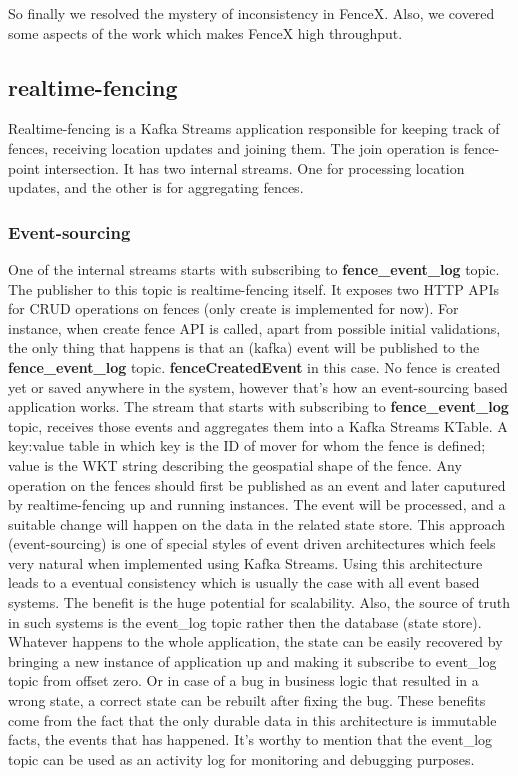 \documentclass[a4]{report}
\begin{document}
    So finally we resolved the mystery of inconsistency in FenceX. Also, we covered some aspects of the work which
    makes FenceX high throughput.

    \subsection{realtime-fencing}
    Realtime-fencing is a Kafka Streams application responsible for keeping track of fences, receiving location updates
    and joining them.
    The join operation is fence-point intersection.
    It has two internal streams.
    One for processing location updates, and the other is for aggregating fences.

    \subsubsection{Event-sourcing}
    One of the internal streams starts with subscribing to \textbf{fence\_event\_log} topic.
    The publisher to this topic is realtime-fencing itself.
    It exposes two HTTP APIs for CRUD operations on fences (only create is implemented for now).
    For instance, when create fence API is called, apart from possible initial validations, the
    only thing that happens is that an (kafka) event will be published to the \textbf{fence\_event\_log} topic.
    \textbf{fenceCreatedEvent} in this case.
    No fence is created yet or saved anywhere in the system, however that's how an event-sourcing based application
    works.
    The stream that starts with subscribing to \textbf{fence\_event\_log} topic, receives those events and aggregates
    them into a Kafka Streams KTable.
    A key:value table in which key is the ID of mover for whom the fence is defined;
    value is the WKT string describing the geospatial shape of the fence.
    Any operation on the fences should first be published as an event and later caputured by realtime-fencing up and
    running instances.
    The event will be processed, and a suitable change will happen on the data in the related state store.
    This approach (event-sourcing) is one of special styles of event driven architectures which feels very natural
    when implemented using Kafka Streams.
    Using this architecture leads to a eventual consistency which is usually the case with all event based systems.
    The benefit is the huge potential for scalability.
    Also, the source of truth in such systems is the event\_log topic rather then the database (state store).
    Whatever happens to the whole application, the state can be easily recovered by bringing a new instance of
    application up and making it subscribe to event\_log topic from offset zero.
    Or in case of a bug in business logic that resulted in a wrong state, a correct state can be rebuilt after fixing
    the bug.
    These benefits come from the fact that the only durable data in this architecture is immutable facts, the
    events that has happened.
    It's worthy to mention that the event\_log topic can be used as an activity log for monitoring and debugging purposes.
\end{document}
